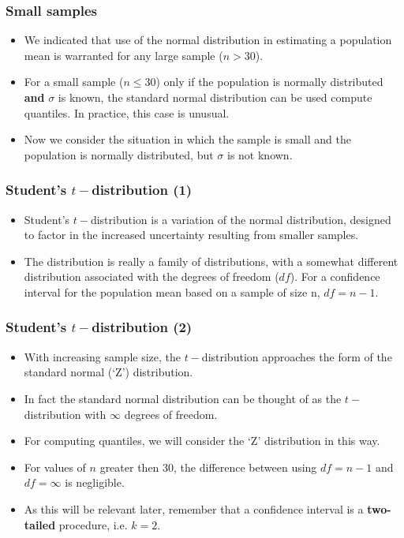 \begin{frame}
\frametitle{Small samples}
\begin{itemize} \item We indicated that use of the normal distribution in estimating a population mean is warranted
for any large sample ($n > 30$). \item For a small sample ($n \leq 30$) only if the population is normally distributed
\textbf{and} $\sigma$ is known, the standard normal distribution can be used compute quantiles. In practice,
this case is unusual.
\item Now we consider the situation in which the sample is small and the population is normally distributed,
but $\sigma$ is not known.
\end{itemize}
\end{frame}
\begin{frame}
\frametitle{Student's $t-$distribution (1)}
\begin{itemize}
\item Student's $t-$distribution is a variation of the normal distribution, designed to factor in the increased uncertainty resulting from smaller samples.
\item The distribution is really a family of distributions, with
a somewhat different distribution associated with the degrees of freedom ($df$). For a confidence interval for the
population mean based on a sample of size n, $df = n - 1$.
\end{itemize}
\end{frame}

\begin{frame}
\frametitle{Student's $t-$distribution (2)}
\begin{itemize}
\item With increasing
sample size, the $t-$distribution approaches the form of the standard normal (`Z') distribution.
\item In fact the standard normal distribution can be thought of as the $t-$distribution with $\infty$ degrees of freedom.
\item For computing quantiles, we will consider the `Z' distribution in this way.
\item For values of $n$ greater then 30, the difference between using $df = n-1$ and $df = \infty$ is negligible.

\item As this will be relevant later, remember that a confidence interval is a \textbf{two-tailed} procedure, i.e. $k=2$.
\end{itemize}
\end{frame}


